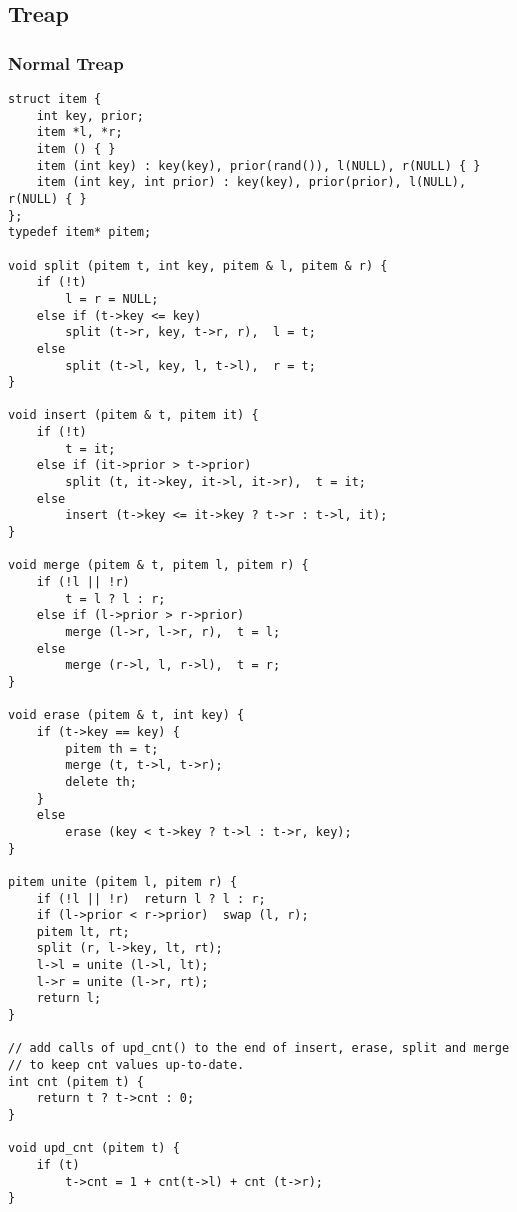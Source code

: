 \subsection{Treap}
\subsubsection{Normal Treap}
\begin{lstlisting}
struct item {
    int key, prior;
    item *l, *r;
    item () { }
    item (int key) : key(key), prior(rand()), l(NULL), r(NULL) { }
    item (int key, int prior) : key(key), prior(prior), l(NULL), r(NULL) { }
};
typedef item* pitem;

void split (pitem t, int key, pitem & l, pitem & r) {
    if (!t)
        l = r = NULL;
    else if (t->key <= key)
        split (t->r, key, t->r, r),  l = t;
    else
        split (t->l, key, l, t->l),  r = t;
}

void insert (pitem & t, pitem it) {
    if (!t)
        t = it;
    else if (it->prior > t->prior)
        split (t, it->key, it->l, it->r),  t = it;
    else
        insert (t->key <= it->key ? t->r : t->l, it);
}

void merge (pitem & t, pitem l, pitem r) {
    if (!l || !r)
        t = l ? l : r;
    else if (l->prior > r->prior)
        merge (l->r, l->r, r),  t = l;
    else
        merge (r->l, l, r->l),  t = r;
}

void erase (pitem & t, int key) {
    if (t->key == key) {
        pitem th = t;
        merge (t, t->l, t->r);
        delete th;
    }
    else
        erase (key < t->key ? t->l : t->r, key);
}

pitem unite (pitem l, pitem r) {
    if (!l || !r)  return l ? l : r;
    if (l->prior < r->prior)  swap (l, r);
    pitem lt, rt;
    split (r, l->key, lt, rt);
    l->l = unite (l->l, lt);
    l->r = unite (l->r, rt);
    return l;
}

// add calls of upd_cnt() to the end of insert, erase, split and merge 
// to keep cnt values up-to-date.
int cnt (pitem t) {
    return t ? t->cnt : 0;
}

void upd_cnt (pitem t) {
    if (t)
        t->cnt = 1 + cnt(t->l) + cnt (t->r);
}
\end{lstlisting}
